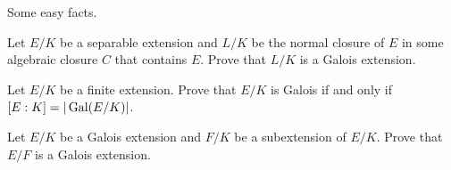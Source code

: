 Some easy facts.

\begin{exercise}
    Let $E/K$ be a separable extension and $L/K$ be the normal 
    closure of $E$ in some algebraic closure $C$
    that contains $E$. Prove that $L/K$ is a Galois extension.
\end{exercise}

\begin{exercise}
    Let $E/K$ be a finite extension. Prove that $E/K$ is Galois
    if and only if $[E:K]=|\operatorname{Gal}(E/K)|$.
\end{exercise}

\begin{exercise}
    Let $E/K$ be a Galois extension and $F/K$ be a subextension of $E/K$. 
    Prove that $E/F$ is a Galois extension. 
\end{exercise}
